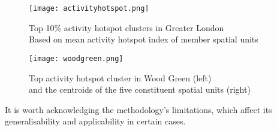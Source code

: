 \begin{figure}[ht]
    \centering
    \texttt{[image: activityhotspot.png]}
    \captionsetup{justification=centering}
    \caption{Top 10\% activity hotspot clusters in Greater London\\Based on mean activity hotspot index of member spatial units}
    \label{fig:activityhotpost}
\end{figure}

\begin{figure}[!hb]
    \centering
    \texttt{[image: woodgreen.png]}
    \captionsetup{justification=centering}
    \caption{Top activity hotspot cluster in Wood Green (left)\\and the centroids of the five constituent spatial units (right)}
    \label{fig:woodgreen}
\end{figure}

It is worth acknowledging the methodology's limitations, which affect its generalisability and applicability in certain cases.

